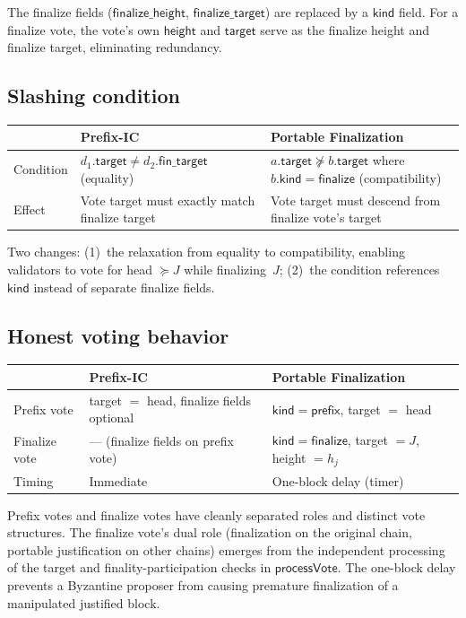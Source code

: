 \ifx\litemode\undefined\documentclass{article}\fi
\newcommand{\target}{\mathsf{target}}
\newcommand{\kind}{\mathsf{kind}}
\newcommand{\height}{\mathsf{height}}
\newcommand{\finalize}{\mathsf{finalize}}
\newcommand{\prefix}{\mathsf{prefix}}
\newcommand{\fintarget}{\mathsf{fin\_target}}
\newcommand{\finalizetarget}{\mathsf{finalize\_target}}
\newcommand{\finalizeheight}{\mathsf{finalize\_height}}
\theoremstyle{plain}
\theoremstyle{definition}
\theoremstyle{remark}
\begin{document}
The finalize fields ($\finalizeheight$, $\finalizetarget$) are replaced by a $\kind$ field.
For a finalize vote, the vote's own $\height$ and $\target$ serve as the finalize height and finalize target, eliminating redundancy.

\subsection*{Slashing condition}

\begin{center}
\begin{tabularx}{\textwidth}{lXX}
\toprule
& \textbf{Prefix-IC} & \textbf{Portable Finalization} \\
\midrule
Condition & $d_1.\target \neq d_2.\fintarget$ (equality) & $a.\target \not\succeq b.\target$ where $b.\kind = \finalize$ (compatibility) \\
Effect & Vote target must exactly match finalize target & Vote target must descend from finalize vote's target \\
\bottomrule
\end{tabularx}
\end{center}

Two changes: (1)~the relaxation from equality to compatibility, enabling validators to vote for head $\succeq J$ while finalizing~$J$; (2)~the condition references $\kind$ instead of separate finalize fields.

\subsection*{Honest voting behavior}

\begin{center}
\begin{tabularx}{\textwidth}{lXX}
\toprule
& \textbf{Prefix-IC} & \textbf{Portable Finalization} \\
\midrule
Prefix vote & target $=$ head, finalize fields optional & $\kind = \prefix$, target $=$ head \\
Finalize vote & --- (finalize fields on prefix vote) & $\kind = \finalize$, target $= J$, height $= h_j$ \\
Timing & Immediate & One-block delay (timer) \\
\bottomrule
\end{tabularx}
\end{center}

Prefix votes and finalize votes have cleanly separated roles and distinct vote structures.
The finalize vote's dual role (finalization on the original chain, portable justification on other chains) emerges from the independent processing of the target and finality-participation checks in $\textsf{processVote}$.
The one-block delay prevents a Byzantine proposer from causing premature finalization of a manipulated justified block.
\end{document}
